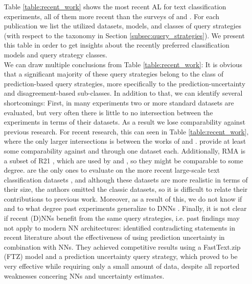 \label{subsec:experiments}
Table \ref{table:recent_work} shows the most recent AL for text classification experiments, all of them more recent than the surveys of \textcite{settles2010active} and \textcite{olsson2009literature}. 
For each publication we list the utilized datasets, models, and classes of query strategies (with respect to the taxonomy in Section \ref{subsec:query_strategies}).
We present this table in order to get insights about the recently preferred classification models and query strategy classes.\\
\pindent We can draw multiple conclusions from Table \ref{table:recent_work}:
It is obvious that a significant majority of these query strategies belong to the class of prediction-based query strategies, more specifically to the prediction-uncertainty and disagreement-based sub-classes. 
In addition to that, we can identify several shortcomings:
First, in many experiments two or more standard datasets are evaluated, but very often there is little to no intersection between the experiments in terms of their datasets. 
As a result we lose comparability against previous research.
For recent research, this can seen in Table \ref{table:recent_work}, where the only larger intersections is between the works of \textcite{zhang2017active} and \textcite{lowell2019practical}.
\textcite{siddhant2018deep} provide at least some comparability against \textcite{zhang2017active} and \textcite{lowell2019practical} through one dataset each.
Additionally, RMA  is a subset of R21 , which are used by \textcite{bloodgood2018support} and \textcite{hu2016active}, so they might be comparable to some degree.
 are the only ones to evaluate on the more recent large-scale text classification datasets , and although these datasets are more realistic in terms of their size, the authors omitted the classic datasets, so it is difficult to relate their contributions to  previous work.
Moreover, as a result of this, we do not know if and to what degree past experiments generalize to DNNs .
\noindent Finally, it is not clear if recent (D)NNs benefit from the same query strategies, i.e. past findings may not apply to modern NN architectures:
\textcite{prabhu2019sampling} identified contradicting statements in recent literature about the effectiveness of using prediction uncertainty in combination with NNs.
They achieved competitive results using a FastText.zip (FTZ) model and a prediction uncertainty query strategy, which proved to be very effective while requiring only a small amount of data, despite all reported weaknesses concering NNs and uncertainty estimates.



